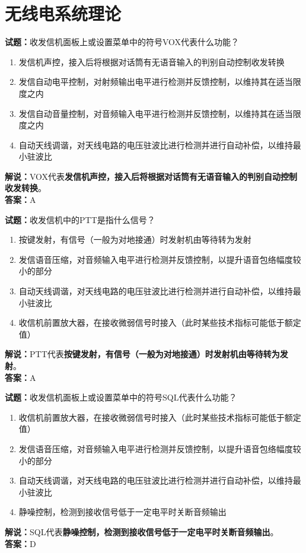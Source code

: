 \documentclass{ctexbook}
\begin{document}


\chapter{无线电系统理论}

\newpage

\textbf{试题：}收发信机面板上或设置菜单中的符号VOX代表什么功能？
\begin{enumerate}[leftmargin=3em]
  \item 发信机声控，接入后将根据对话筒有无语音输入的判别自动控制收发转换
  \item 发信自动电平控制，对射频输出电平进行检测并反馈控制，以维持其在适当限度之内
  \item 发信自动音量控制，对音频输入电平进行检测并反馈控制，以维持其在适当限度之内
  \item 自动天线调谐，对天线电路的电压驻波比进行检测并进行自动补偿，以维持最小驻波比
\end{enumerate}
\noindent\textbf{解说：}VOX代表\textbf{发信机声控，接入后将根据对话筒有无语音输入的判别自动控制收发转换}。\\\noindent\textbf{答案：}A

\vspace{1em}

\textbf{试题：}收发信机中的PTT是指什么信号？
\begin{enumerate}[leftmargin=3em]
  \item 按键发射，有信号（一般为对地接通）时发射机由等待转为发射
  \item 发信语音压缩，对音频输入电平进行检测并反馈控制，以提升语音包络幅度较小的部分
  \item 自动天线调谐，对天线电路的电压驻波比进行检测并进行自动补偿，以维持最小驻波比
  \item 收信机前置放大器，在接收微弱信号时接入（此时某些技术指标可能低于额定值）
\end{enumerate}
\noindent\textbf{解说：}PTT代表\textbf{按键发射，有信号（一般为对地接通）时发射机由等待转为发射}。\\\noindent\textbf{答案：}A

\vspace{1em}

\textbf{试题：}收发信机面板上或设置菜单中的符号SQL代表什么功能？
\begin{enumerate}[leftmargin=3em]
  \item 收信机前置放大器，在接收微弱信号时接入（此时某些技术指标可能低于额定值）
  \item 发信语音压缩，对音频输入电平进行检测并反馈控制，以提升语音包络幅度较小的部分
  \item 自动天线调谐，对天线电路的电压驻波比进行检测并进行自动补偿，以维持最小驻波比
  \item 静噪控制，检测到接收信号低于一定电平时关断音频输出
\end{enumerate}
\noindent\textbf{解说：}SQL代表\textbf{静噪控制，检测到接收信号低于一定电平时关断音频输出}。\\\noindent\textbf{答案：}D
\end{document}

